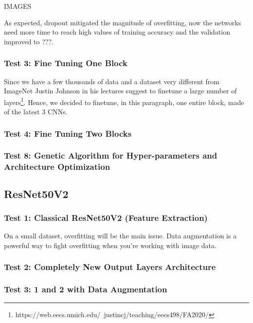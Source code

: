 \medskip

IMAGES

\noindent As expected, dropout mitigated the magnitude of overfitting, now the networks need more time to reach high values of training accuracy and the validation improved to ???.



\subsubsection{Test 3: Fine Tuning  One Block}
Since we have a few thousands of data and a dataset very different from ImageNet Justin Johnson in his lectures suggest to finetune a large number of layers\footnote{https://web.eecs.umich.edu/~justincj/teaching/eecs498/FA2020/}. Hence, we decided to finetune, in this paragraph, one entire block, made of the latest 3 CNNs.

\subsubsection{Test 4: Fine Tuning  Two Blocks}

\subsubsection{Test 8: Genetic Algorithm for Hyper-parameters and Architecture Optimization}





\subsection{ResNet50V2}

\subsubsection{Test 1: Classical ResNet50V2 (Feature Extraction)}
On a small dataset, overfitting will be the main issue. Data augmentation is a powerful way to fight overfitting when you’re working with image data.

\subsubsection{Test 2: Completely New Output Layers Architecture}

\subsubsection{Test 3: 1 and 2 with Data Augmentation}

